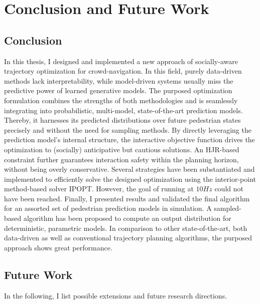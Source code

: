 \chapter{Conclusion and Future Work}
\label{text:conclusion}

\section{Conclusion}
\label{text:conclusions/conclusions}
In this thesis, I designed and implemented a new approach of socially-aware trajectory optimization for crowd-navigation. In this field, purely data-driven methods lack interpretability, while model-driven systems usually miss the predictive power of learned generative models. The purposed optimization formulation combines the strengths of both methodologies and is seamlessly integrating into probabilistic, multi-model, state-of-the-art prediction models. Thereby, it harnesses its predicted distributions over future pedestrian states precisely and without the need for sampling methods.
\newline\newline
By directly leveraging the prediction model's internal structure, the interactive objective function drives the optimization to (socially) anticipative but cautious solutions. An \ac{HJR}-based constraint further guarantees interaction safety within the planning horizon, without being overly conservative.
\newline\newline
Several strategies have been substantiated and implemented to efficiently solve the designed optimization using the interior-point method-based solver \ac{IPOPT}. However, the goal of running at $10 Hz$ could not have been reached.
\newline\newline
Finally, I presented results and validated the final algorithm for an assorted set of pedestrian prediction models in simulation. A sampled-based algorithm has been proposed to compute an output distribution for deterministic, parametric models. In comparison to other state-of-the-art, both data-driven as well as conventional trajectory planning algorithms, the purposed approach shows great performance.
\newline

\section{Future Work}
\label{text:conclusions/future_work}
In the following, I list possible extensions and future research directions.

